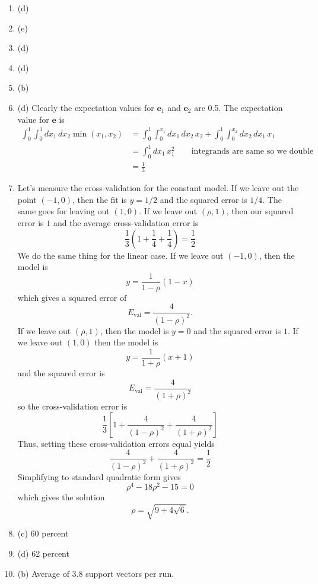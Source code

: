 \documentclass[12pt]{article}
\newcommand{\be}{\mathbf{e}}
\begin{document}
\begin{enumerate}[leftmargin=*]
\item (d)
\item (e)
\item (d)
\item (d)
\item (b)
\item (d) Clearly the expectation values for $\be_1$ and $\be_2$ are 0.5. The expectation value for $\be$ is 
\begin{align*}
\int_0^1 \int_0^1 d x_1 \, dx_2 \min (x_1, x_2) &= \int_0^1 \int_0^{x_1} dx_1 \, dx_2 \, x_2 + \int_0^1 \int_0^{x_2} dx_2 \, dx_1 \, x_1 \\
&= \int_0^1 dx_1 \, x_1^2 \qquad \text{integrands are same so we double} \\
&= \frac{1}{3}
\end{align*}
\item Let's measure the cross-validation for the constant model. If we leave out the point $(-1, 0)$, then the fit is $y = 1/2$ and the squared error is $1/4$. The same goes for leaving out $(1, 0)$. If we leave out $(\rho, 1)$, then our squared error is $1$ and the average cross-validation error is
\[ \frac{1}{3} \left( 1 + \frac{1}{4} + \frac{1}{4} \right) = \frac{1}{2} \]
We do the same thing for the linear case. If we leave out $(-1, 0)$, then the model is
\[ y = \frac{1}{1 - \rho} \left( 1 - x \right) \]
which gives a squared error of
\[ E_{\text{val}} = \frac{4}{(1 - \rho)^2}. \]
If we leave out $(\rho, 1)$, then the model is $y = 0$ and the squared error is $1$. If we leave out $(1, 0)$ then the model is
\[ y = \frac{1}{1 + \rho} (x + 1) \]
and the squared error is
\[ E_{\text{val}} = \frac{4}{(1 + \rho)^2} \]
so the cross-validation error is
\[ \frac{1}{3} \left[ 1 + \frac{4}{(1 - \rho)^2} + \frac{4}{(1 + \rho)^2} \right] \]
Thus, setting these cross-validation errors equal yields
\[ \frac{4}{(1 - \rho)^2} + \frac{4}{(1 + \rho)^2} = \frac{1}{2} \]
Simplifying to standard quadratic form gives
\[ \rho^4 - 18 \rho^2 - 15 = 0 \]
which gives the solution
\[ \rho = \sqrt{9 + 4 \sqrt 6}. \]
\item (c) 60 percent
\item (d) 62 percent
\item (b) Average of 3.8 support vectors per run.
\end{enumerate}
\end{document}
